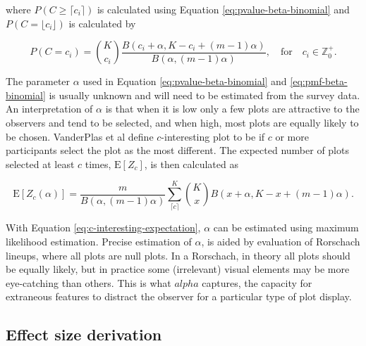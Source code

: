\documentclass[]{interact}
\theoremstyle{plain}%
\theoremstyle{definition}
\theoremstyle{remark}
\begin{document}
\noindent where \(P(C \geq \lceil c_i \rceil)\) is calculated using
Equation \ref{eq:pvalue-beta-binomial} and
\(P(C = \lfloor c_i \rfloor)\) is calculated by

\begin{equation} \label{eq:pmf-beta-binomial}
P(C = c_i) = {K \choose c_i}\frac{B(c_i + \alpha, K - c_i + (m - 1)\alpha)}{B(\alpha, (m-1)\alpha)},\quad \text{for} \quad c_i \in \mathbb{Z}_0^+.
\end{equation}

The parameter \(\alpha\) used in Equation \ref{eq:pvalue-beta-binomial}
and \ref{eq:pmf-beta-binomial} is usually unknown and will need to be
estimated from the survey data. An interpretation of \(\alpha\) is that
when it is low only a few plots are attractive to the observers and tend
to be selected, and when high, most plots are equally likely to be
chosen. VanderPlas et al define \(c\)-interesting plot to be if \(c\) or
more participants select the plot as the most different. The expected
number of plots selected at least \(c\) times, \(\mathrm{E}[Z_c]\), is
then calculated as

\begin{equation} \label{eq:c-interesting-expectation}
\mathrm{E}[Z_c(\alpha)] = \frac{m}{B(\alpha, (m-1)\alpha)}\sum_{\lceil c \rceil}^{K}{K \choose x} B(x + \alpha, K - x + (m-1)\alpha).\end{equation}

With Equation \ref{eq:c-interesting-expectation}, \(\alpha\) can be
estimated using maximum likelihood estimation. Precise estimation of
\(\alpha\), is aided by evaluation of Rorschach lineups, where all plots
are null plots. In a Rorschach, in theory all plots should be equally
likely, but in practice some (irrelevant) visual elements may be more
eye-catching than others. This is what \(alpha\) captures, the capacity
for extraneous features to distract the observer for a particular type
of plot display.

\hypertarget{effect-size-derivation}{%
\subsection{Effect size derivation}\label{effect-size-derivation}}
\end{document}
